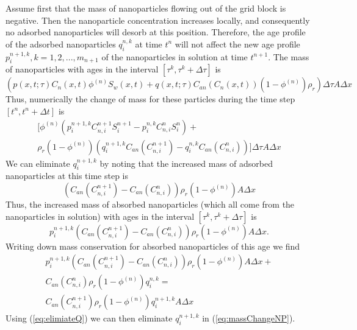 Assume first that the mass of nanoparticles flowing out of the grid block is negative. Then the nanoparticle concentration increases locally, and consequently no adsorbed nanoparticles will desorb at this position. Therefore, the age profile of the adsorbed nanoparticles $q_i^{n,k}$ at time $t^n$ will not affect the new age profile  $p_i^{n+1,k},k=1,2,...,m_{n+1}$ of the nanoparticles in solution at time  $t^{n+1}$. The mass of nanoparticles with ages in the interval $\left[\tau^k, \tau^k+\Delta\tau\right]$ is
\begin{equation*}
    \left(p(x,t;\tau)C_n(x,t)\phi^{(n)}S_w(x,t) + q(x,t;\tau)C_{an}(C_n(x,t))(1-\phi^{(n)})\rho_r\right) \Delta\tau A\Delta x
\end{equation*}
Thus, numerically the change of mass for these particles during the time step $\left[t^n, t^n+\Delta t\right]$ is
\begin{multline} \label{eq:massChangeNP} %
    \bigg[\phi^{(n)}\left(p_i^{n+1,k}C_{n,i}^{n+1}S_i^{n+1}- p_{i}^{n,k}C_{n,i}^{n}S_{i}^{n}\right) +\\ \rho_r(1-\phi^{(n)}) \left(q_i^{n+1,k}C_{an}(C_{n,i}^{n+1})- q_{i}^{n,k}C_{an}(C_{n,i}^{n})\right)\bigg]
    \Delta\tau A\Delta x
\end{multline}
We can eliminate $q_{i}^{n+1,k}$ by noting that the increased mass of adsorbed nanoparticles at this time step is
\begin{equation*}
    \left(C_{an}(C_{n,i}^{n+1})- C_{an}(C_{n,i}^{n})\right)
    \rho_r\left(1-\phi^{(n)}\right) A\Delta x
\end{equation*}
Thus, the increased mass of absorbed nanoparticles (which all come from the nanoparticles in solution) with ages in the interval $\left[\tau^k, \tau^k+\Delta\tau\right]$ is
\begin{equation*}
    p_i^{n+1,k}\left(C_{an}(C_{n,i}^{n+1})- C_{an}(C_{n,i}^{n})\right)
    \rho_r\left(1-\phi^{(n)}\right) A\Delta x.
\end{equation*}
Writing down mass conservation for absorbed nanoparticles of this age we find
\begin{multline} \label{eq:elimiateQ} %
    p_i^{n+1,k}\left(C_{an}(C_{n,i}^{n+1})- C_{an}(C_{n,i}^{n})\right)
    \rho_r\left(1-\phi^{(n)}\right) A\Delta x + \\
    C_{an}(C_{n,i}^{n})\rho_r\left(1-\phi^{(n)}\right)q_i^{n,k} = \\
    C_{an}(C_{n,i}^{n+1})\rho_r\left(1-\phi^{(n)}\right)q_i^{n+1,k}A\Delta x 
\end{multline}
Using (\ref{eq:elimiateQ}) we can then eliminate $q_i^{n+1,k}$ in (\ref{eq:massChangeNP}). 

